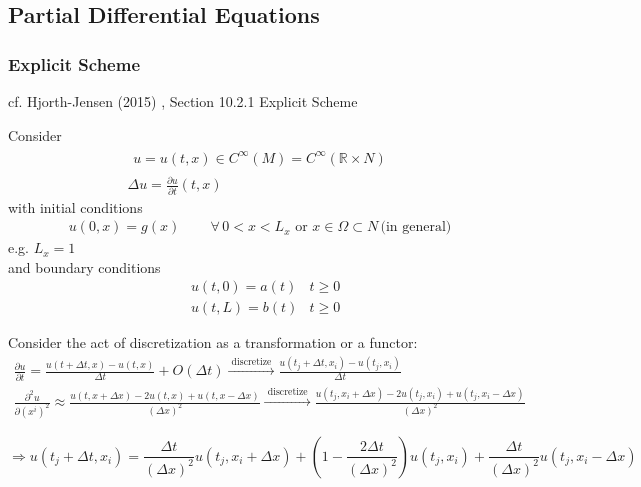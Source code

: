 \documentclass[10pt]{amsart}
\begin{document}
\begin{multicols*}{2}
\section{Partial Differential Equations}

\subsubsection{Explicit Scheme}
cf. Hjorth-Jensen (2015) \cite{Hjor2015}, Section 10.2.1 Explicit Scheme

Consider
\begin{equation}
\begin{gathered}
  \begin{gathered}
    u = u(t,x) \in C^{\infty}(M) = C^{\infty}(\mathbb{R}\times N)  
  \end{gathered} \\
      \Delta u = \frac{ \partial u}{ \partial t}(t,x)
  \end{gathered}
  \end{equation}
with initial conditions
\[
  \begin{gathered}
    u(0,x)=g(x) \qquad \, \forall \, 0 < x < L_x \text{ or } x \in \Omega \subset N \, \text{(in general)}
    \end{gathered}
  \]
  e.g. $L_x=1$ \\

  and boundary conditions
  \[
\begin{aligned}
  & u(t,0) = a(t) & t \geq 0 \\ 
  & u(t,L) = b(t) & t \geq 0 
\end{aligned}
  \]

  Consider the act of discretization as a transformation or a functor:
  \begin{equation}
\begin{gathered}
  \frac{ \partial u}{ \partial t} = \frac{ u(t+\Delta t,x) - u(t,x) }{ \Delta t} + O(\Delta t) \xrightarrow{ \text{ discretize } } \frac{ u(t_j + \Delta t, x_i) - u(t_j,x_i) }{ \Delta t } \\
  \frac{ \partial^2 u}{ \partial (x^i)^2 } \approx \frac{ u(t,x + \Delta x) - 2 u(t,x) + u(t, x-\Delta x) }{ (\Delta x)^2 }  \xrightarrow{ \text{ discretize } } \frac{ u(t_j  , x_i+\Delta x) - 2 u(t_j,x_i) + u(t_j,x_i-\Delta x) }{ ( \Delta x)^2 } 
\end{gathered}
  \end{equation}

  \begin{equation}
\Longrightarrow u(t_j + \Delta t, x_i) = \frac{ \Delta t}{ (\Delta x)^2 } u(t_j,x_i + \Delta x) + \left( 1 - \frac{ 2 \Delta t}{ (\Delta x)^2 } \right) u (t_j,x_i) + \frac{ \Delta t}{ (\Delta x)^2 } u(t_j,x_i - \Delta x)
  \end{equation}


\end{multicols*}
\end{document}
